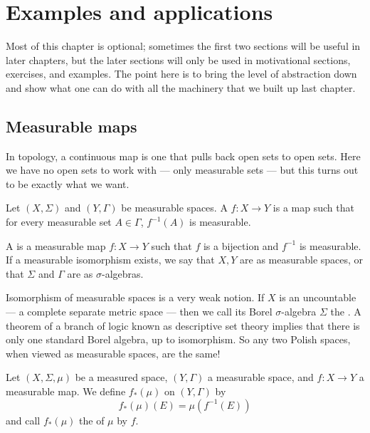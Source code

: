 
\chapter{Examples and applications}
Most of this chapter is optional; sometimes the first two sections will be useful in later chapters, but the later sections will only be used in motivational sections, exercises, and examples.
The point here is to bring the level of abstraction down and show what one can do with all the machinery that we built up last chapter.

\section{Measurable maps}
In topology, a continuous map is one that pulls back open sets to open sets.
Here we have no open sets to work with --- only measurable sets --- but this turns out to be exactly what we want.

\begin{definition}
Let $(X, \Sigma)$ and $(Y, \Gamma)$ be measurable spaces.
A  $f: X \to Y$ is a map such that for every measurable set $A \in \Gamma$, $f^{-1}(A)$ is measurable.

A  is a measurable map $f: X \to Y$ such that $f$ is a bijection and $f^{-1}$ is measurable.
If a measurable isomorphism exists, we say that $X,Y$ are  as measurable spaces, or that $\Sigma$ and $\Gamma$ are  as $\sigma$-algebras.
\end{definition}

\begin{example}
Isomorphism of measurable spaces is a very weak notion.
If $X$ is an uncountable  --- a complete separate metric space --- then we call its Borel $\sigma$-algebra $\Sigma$ the .
A theorem of a branch of logic known as descriptive set theory implies that there is only one standard Borel algebra, up to isomorphism.
So any two Polish spaces, when viewed as measurable spaces, are the same!
\end{example}

\begin{definition}
Let $(X, \Sigma, \mu)$ be a measured space, $(Y, \Gamma)$ a measurable space, and $f: X \to Y$ a measurable map.
We define $f_{*}(\mu)$ on $(Y, \Gamma)$ by
\[f_{*}(\mu)(E) = \mu(f^{-1}(E))\]
and call $f_{*}(\mu)$ the  of $\mu$ by $f$.
\end{definition}


